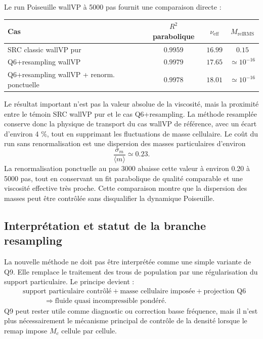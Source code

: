 \documentclass[11pt,a4paper]{article}
\begin{document}
Le run Poiseuille wallVP à 5000 pas fournit une comparaison directe :
\begin{center}
\begin{tabular}{lccc}
\toprule
Cas & $R^2$ parabolique & $\nu_{\mathrm{eff}}$ & $M_{\mathrm{relRMS}}$ \\
\midrule
SRC classic wallVP pur & $0.9959$ & $16.99$ & $0.15$ \\
Q6+resampling wallVP & $0.9979$ & $17.65$ & $\simeq10^{-16}$ \\
Q6+resampling wallVP + renorm. ponctuelle & $0.9978$ & $18.01$ & $\simeq10^{-16}$ \\
\bottomrule
\end{tabular}
\end{center}
Le résultat important n'est pas la valeur absolue de la viscosité, mais la proximité entre le témoin SRC wallVP pur et le cas Q6+resampling. La méthode resamplée conserve donc la physique de transport du cas wallVP de référence, avec un écart d'environ 4 \%, tout en supprimant les fluctuations de masse cellulaire. Le coût du run sans renormalisation est une dispersion des masses particulaires d'environ
\begin{equation}
  \frac{\sigma_m}{\langle m\rangle}\simeq 0.23.
\end{equation}
La renormalisation ponctuelle au pas 3000 abaisse cette valeur à environ $0.20$ à 5000 pas, tout en conservant un fit parabolique de qualité comparable et une viscosité effective très proche. Cette comparaison montre que la dispersion des masses peut être contrôlée sans disqualifier la dynamique Poiseuille.

\subsection{Interprétation et statut de la branche resampling}

La nouvelle méthode ne doit pas être interprétée comme une simple variante de Q9. Elle remplace le traitement des trous de population par une régularisation du support particulaire. Le principe devient :
\begin{equation}
\begin{aligned}
  &\text{support particulaire contrôlé}
  + \text{masse cellulaire imposée}
  + \text{projection Q6} \\
  &\hspace{3em}\Longrightarrow
  \text{fluide quasi incompressible pondéré}.
\end{aligned}
\end{equation}
Q9 peut rester utile comme diagnostic ou correction basse fréquence, mais il n'est plus nécessairement le mécanisme principal de contrôle de la densité lorsque le remap impose $M_c$ cellule par cellule.
\end{document}
